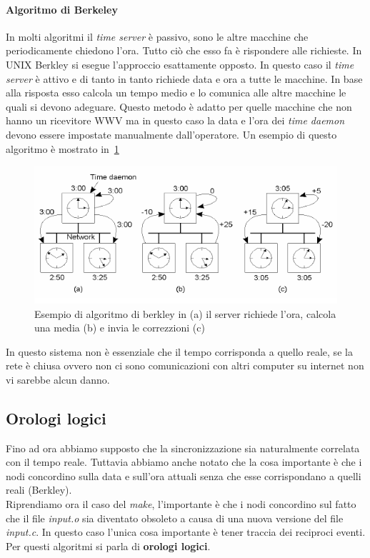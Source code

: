 \paragraph{Algoritmo di Berkeley}
In molti algoritmi il \emph{time server} è passivo, sono le altre macchine che periodicamente chiedono l'ora. Tutto ciò che esso fa è rispondere alle richieste. In UNIX Berkley si esegue l'approccio esattamente opposto. In questo caso il \emph{time server} è attivo e di tanto in tanto richiede data e ora a tutte le macchine. In base alla risposta esso calcola un tempo medio e lo comunica alle altre macchine le quali si devono adeguare. Questo metodo è adatto per quelle macchine che non hanno un ricevitore WWV ma in questo caso la data e l'ora dei \emph{time daemon} devono essere impostate manualmente dall'operatore. Un esempio di questo algoritmo è mostrato in \figurename\,\ref{fig:berkley}
\begin{figure}
\centering
\includegraphics[scale=0.5]{img/berkley.png}
\caption{Esempio di algoritmo di berkley in (a) il server richiede l'ora, calcola una media (b) e invia le correzzioni (c)}\label{fig:berkley}
\end{figure}
In questo sistema non è essenziale che il tempo corrisponda a quello reale, se la rete è chiusa ovvero non ci sono comunicazioni con altri computer su internet non vi sarebbe alcun danno.
\subsection{Orologi logici}
Fino ad ora abbiamo supposto che la sincronizzazione sia naturalmente correlata con il tempo reale. Tuttavia abbiamo anche notato che la cosa importante è che i nodi concordino sulla data e sull'ora attuali senza che esse corrispondano a quelli reali (Berkley).\\
Riprendiamo ora il caso del \emph{make}, l'importante è che i nodi concordino sul fatto che il file \emph{input.o} sia diventato obsoleto a causa di una nuova versione del file \emph{input.c}. In questo caso l'unica cosa importante è tener traccia dei reciproci eventi. Per questi algoritmi si parla di \textbf{orologi logici}.
